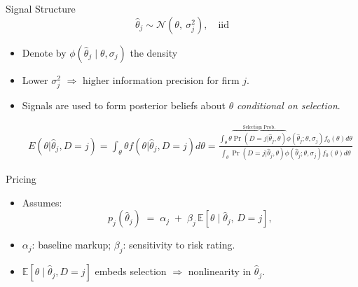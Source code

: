 \documentclass[10pt,aspectratio=169]{beamer}
\begin{document}
\begin{frame}{Signal Structure}
\justifying
\begin{equation}
\hat{\theta}_j \sim \mathcal{N}(\theta,\ \sigma_j^2), \quad \text{iid}  
\label{eq:signal}
\end{equation}
\begin{itemize}
  \item Denote by $\phi(\hat{\theta}_j \mid \theta, \sigma_j)$ the density
  \item Lower $\sigma_j^2$ $\Rightarrow$ higher information precision for firm $j$.
  \item Signals are used to form posterior beliefs about $\theta$ \emph{conditional on selection}.

\begin{align}
  E(\theta | \hat{\theta}_j, D=j) = \int_{\theta} \theta f(\theta | \hat{\theta}_j, D=j) d\theta = \frac{\int_{\theta} \theta \overbrace{\Pr(D=j | \hat{\theta}_j, \theta)}^{\text{Selection Prob.}} \phi(\hat{\theta}_j; \theta, \sigma_j) f_0(\theta) d\theta}{\int_{\theta} \Pr(D=j | \hat{\theta}_j, \theta) \phi(\hat{\theta}_j; \theta, \sigma_j) f_0(\theta) d\theta}  
\end{align}
\end{itemize}
\end{frame}

\begin{frame}{Pricing}
\begin{itemize}
\item Assumes: 
  \begin{equation}
p_j(\hat{\theta}_j) \;=\; \alpha_j \;+\; \beta_j \, \mathbb{E}[\theta \mid \hat{\theta}_j,\, D=j],
\end{equation}
  \item $\alpha_j$: baseline markup; $\beta_j$: sensitivity to risk rating.
  \item $\mathbb{E}[\theta \mid \hat{\theta}_j, D=j]$ embeds selection $\Rightarrow$ nonlinearity in $\hat{\theta}_j$.
\end{itemize}
\end{frame}
\end{document}

